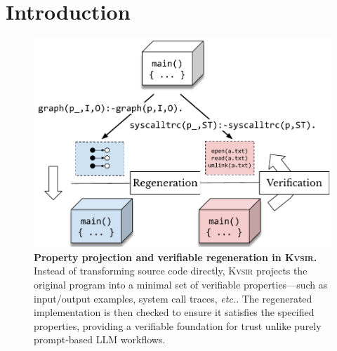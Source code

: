 \documentclass[sigplan,review,anonymous,10pt]{acmart}
\def\etc{{\em etc.}\xspace}
\newcommand{\sys}{{\scshape Kv{\textalpha}sir}\xspace}
\begin{document}
\maketitle

\section{Introduction}

\begin{figure}[t]
  \includegraphics[width=.7\columnwidth]{figs/kvasir_projection.pdf}
  \caption{\textbf{Property projection and verifiable regeneration in \sys.}
  Instead of transforming source code directly, \sys projects the original
  program into a minimal set of verifiable properties---such as input/output
  examples, system call traces, \etc.
  The regenerated implementation is then checked to
  ensure it satisfies the specified properties, providing a verifiable
  foundation for trust unlike purely prompt-based LLM workflows.}
  \label{fig:projection}
\end{figure}


\end{document}
